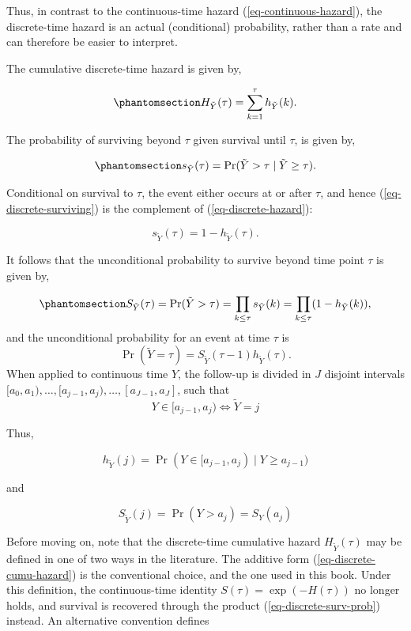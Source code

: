 \documentclass[
  letterpaper,
  krantz2]{style/krantz}
\begin{document}
Thus, in contrast to the continuous-time hazard
(\ref{eq-continuous-hazard}), the discrete-time hazard is an actual
(conditional) probability, rather than a rate and can therefore be
easier to interpret.

The cumulative discrete-time hazard is given by,

\begin{equation}\phantomsection\label{eq-discrete-cumu-hazard}{
H_{\tilde{Y}}(\tau) = \sum_{k=1}^{\tau}h_{\tilde{Y}}(k).
}\end{equation}

The probability of surviving beyond \(\tau\) given survival until
\(\tau\), is given by,

\begin{equation}\phantomsection\label{eq-discrete-surviving}{
s_{\tilde{Y}}(\tau) = \Pr(\tilde{Y}> \tau \mid \tilde{Y} \geq \tau).
}\end{equation}

Conditional on survival to \(\tau\), the event either occurs at or after
\(\tau\), and hence (\ref{eq-discrete-surviving}) is the complement of
(\ref{eq-discrete-hazard}):

\[
s_{\tilde{Y}}(\tau) = 1 - h_{\tilde{Y}}(\tau).
\]

It follows that the unconditional probability to survive beyond time
point \(\tau\) is given by,

\begin{equation}\phantomsection\label{eq-discrete-surv-prob}{
S_{\tilde{Y}}(\tau) = \Pr(\tilde{Y} > \tau) = \prod_{k\leq\tau} s_{\tilde{Y}}(k) = \prod_{k\leq\tau}(1-h_{\tilde{Y}}(k)),
}\end{equation} and the unconditional probability for an event at time
\(\tau\) is \[
\Pr(\tilde{Y}=\tau) = S_{\tilde{Y}}(\tau-1) h_{\tilde{Y}}(\tau).
\] When applied to continuous time \(Y\), the follow-up is divided in
\(J\) disjoint intervals
\([a_0,a_{1}), \ldots, [a_{j-1},a_j), \ldots, [a_{J-1},a_{J}]\), such
that \[
Y \in [a_{j-1}, a_j) \Leftrightarrow \tilde{Y} = j
\]

Thus,

\[
h_{\tilde{Y}}(j) = \Pr(Y \in [a_{j-1},a_j) \mid Y \geq a_{j-1})
\]

and

\[
S_{\tilde{Y}}(j) = \Pr(Y > a_{j}) = S_Y(a_{j})
\]

Before moving on, note that the discrete-time cumulative hazard
\(H_{\tilde{Y}}(\tau)\) may be defined in one of two ways in the
literature. The additive form (\ref{eq-discrete-cumu-hazard}) is the
conventional choice, and the one used in this book. Under this
definition, the continuous-time identity \(S(\tau) = \exp(-H(\tau))\) no
longer holds, and survival is recovered through the product
(\ref{eq-discrete-surv-prob}) instead. An alternative convention defines
\end{document}
